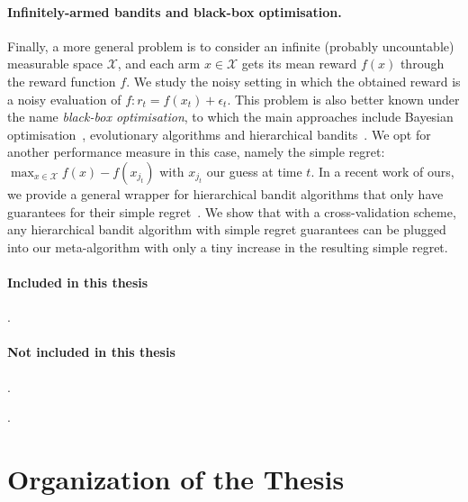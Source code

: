 \paragraph{Infinitely-armed bandits and black-box optimisation.} Finally, a more general problem is to consider an infinite (probably uncountable) measurable space $\mathcal{X}$, and each arm $x\in\mathcal{X}$ gets its mean reward $f(x)$ through the reward function $f$. We study the noisy setting in which the obtained reward is a noisy evaluation of $f: r_t = f(x_t) + \epsilon_t$. This problem is also better known under the name \emph{black-box optimisation}, to which the main approaches include Bayesian optimisation~\citep{brochu2010bayesian}, evolutionary algorithms and hierarchical bandits~\citep{bubeck2010x}. We opt for another performance measure in this case, namely the simple regret: $\max_{x\in\mathcal{X}} f(x) - f(x_{j_t})$ with $x_{j_t}$ our guess at time $t$. In a recent work of ours, we provide a general wrapper for hierarchical bandit algorithms that only have guarantees for their simple regret~\cite{shang2019adaptive}. We show that with a cross-validation scheme, any hierarchical bandit algorithm with simple regret guarantees can be plugged into our meta-algorithm with only a tiny increase in the resulting simple regret.

\paragraph{Included in this thesis}

\cite{shang2018adaptive,shang2019dttts,shang2019adaptive,shang2020dttts,degenne2020game,shang2020t3c}.

\paragraph{Not included in this thesis}

\cite{shang2020vector,shang2021safe,menard2021ucbmq}.

\cite{rlberry2021}.

\section{Organization of the Thesis}\label{sec:intro.organization}

% 
% 
